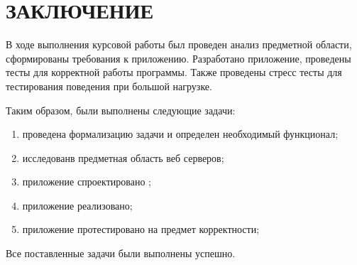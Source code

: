 \section*{\hfill{\centering ЗАКЛЮЧЕНИЕ }\hfill}
В ходе выполнения курсовой работы был проведен анализ предметной области, сформированы требования к приложению. Разработано приложение, проведены тесты для корректной работы программы. Также проведены стресс тесты для тестирования поведения при большой нагрузке.

Таким образом, были выполнены следующие задачи:
\begin{enumerate}[label={\arabic*)}]
    \item проведена формализацию задачи и определен необходимый функционал;
    \item исследованв предметная область веб серверов;
    \item  приложение спроектировано ;
    \item  приложение реализовано;
    \item приложение протестировано на предмет корректности;
\end{enumerate}

Все поставленные задачи были выполнены успешно.
